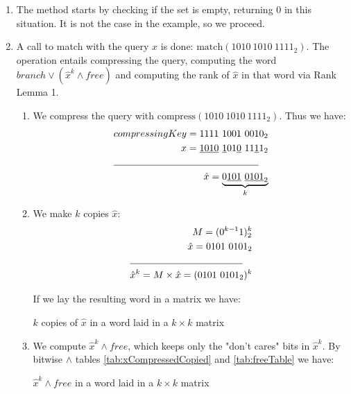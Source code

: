 \begin{enumerate}
    \item
    The method starts by checking if the set is empty, returning $0$ in this situation. It is not the case in the example, so we proceed.
    
    \item
    A call to {\ttfamily match} with the query $x$ is done: $\text{match}(1010\ 1010\ 1111_2)$. The operation entails compressing the query, computing the word $branch \vee (\hat x^k \wedge free)$ and computing the rank of $\hat x$ in that word via Rank Lemma 1.
    \begin{enumerate}
        \item
        We compress the query with $\text{compress}(1010\ 1010\ 1111_2)$. Thus we have:
        \begin{align*}
            compressingKey = 1111\ 1001\ 0010_2\\
            x = \underline{1010}\ \underline{1}01\underline{0}\ 11\underline{1}1_2\\
            \cline{1-2}
            \hat x = \underbrace{0\underline{101}\ \underline{0101}_2}_k
        \end{align*}
        \item
        We make $k$ copies $\hat x$:
        \begin{align*}
            M = (0^{k-1}1)^k_2\\
            \hat x = 0101\ 0101_2\\
            \cline{1-2}
            \hat x^k = M \times \hat x = (0101\ 0101_2)^k\\
        \end{align*}
        
        If we lay the resulting word in a matrix we have:
        \begin{table}[H]
        \centering
        
        \caption[Example of a compressed key copied $k$ times and laid in a $k \times k$ matrix]{$k$ copies of $\hat x$ in a word laid in a $k \times k$ matrix}
        \label{tab:xCompressedCopied}
        \end{table}
        
        \item
        We compute $\hat x^k \wedge free$, which keeps only the "don't cares" bits in $\hat x^k$. By bitwise $\wedge$ tables \ref{tab:xCompressedCopied} and \ref{tab:freeTable} we have:
        \begin{table}[H]
        \centering
        
        \caption[Example of $\hat x^k \wedge free$ in a word laid in a $k \times k$ matrix]{$\hat x^k \wedge free$ in a word laid in a $k \times k$ matrix}
        \label{tab:xCompressedANDfree}
        \end{table}
        

\end{enumerate}
\end{enumerate}
